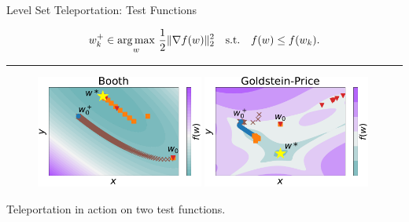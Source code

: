 \documentclass[usenames,dvipsnames,mathserif,notheorems]{beamer}
\newcommand{\horizontalrule}{
	{
			\vspace{-0.5em}
			\center \rule{\textwidth}{0.1em}
			\vspace{-0.2em}
		}
}
\begin{document}
\begin{frame}{Level Set Teleportation: Test Functions}

    \[
        w_k^+ \in \mathop{\rm arg\,max}_w \, \frac 1 2 \|\nabla f(w)\|^2_2  \quad \text{s.t.} \quad f(w) \leq f(w_k).
    \]

    \horizontalrule
    \pause

    \begin{figure}[]
        \centering
        \includegraphics[width=0.49\textwidth]{assets/Booth-2d.pdf}
        \includegraphics[width=0.49\textwidth]{assets/Goldstein-Price-2d.pdf}
    \end{figure}

    \begin{center}
        \Large Teleportation in action on two test functions.
    \end{center}
\end{frame}
\end{document}
